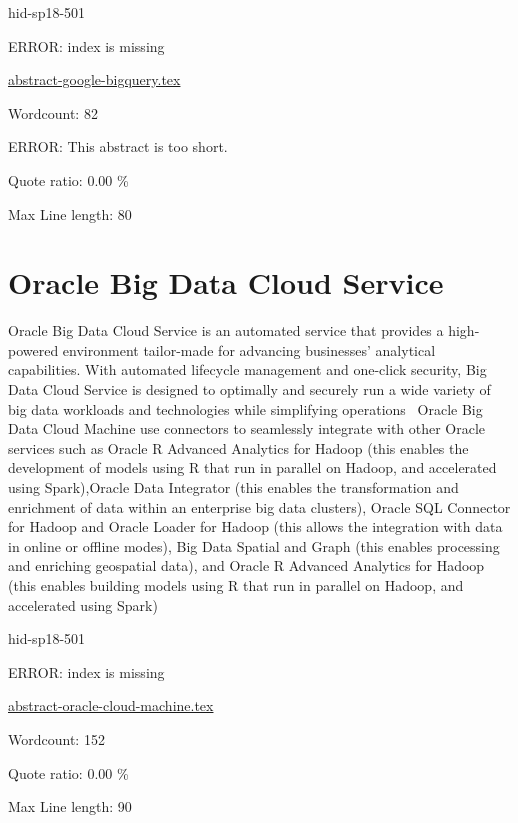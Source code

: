 \begin{IU}

hid-sp18-501

ERROR: index is missing

\href{https://github.com/cloudmesh-community/hid-sp18-501/blob/master//technology/abstract-google-bigquery.tex}{abstract-google-bigquery.tex}

 

Wordcount: 82

ERROR: This abstract is too short.


Quote ratio: 0.00 \%
 
Max Line length: 80
\end{IU}

\section{Oracle Big Data Cloud Service}


Oracle Big Data Cloud Service is an automated service that provides a
high-powered environment tailor-made for advancing businesses' analytical
capabilities. With automated lifecycle management and one-click security, Big
Data Cloud Service is designed to optimally and securely run a wide variety of
big data workloads and technologies while simplifying
operations~\cite{hid-sp18-501-OracleCloud} Oracle Big Data Cloud Machine use connectors to
seamlessly integrate with other Oracle services such as Oracle R Advanced
Analytics for Hadoop (this enables the development of models using R that run in
parallel on Hadoop, and accelerated using Spark),Oracle Data Integrator (this
enables the transformation and enrichment of data within an enterprise big data
clusters), Oracle SQL Connector for Hadoop and Oracle Loader for Hadoop (this
allows the integration with data in online or offline modes), Big Data Spatial
and Graph (this enables processing and enriching geospatial data), and Oracle R
Advanced Analytics for Hadoop (this enables building models using R that run in
parallel on Hadoop, and accelerated using Spark)~\cite{hid-sp18-501-OracleCloud}




\begin{IU}

hid-sp18-501

ERROR: index is missing

\href{https://github.com/cloudmesh-community/hid-sp18-501/blob/master//technology/abstract-oracle-cloud-machine.tex}{abstract-oracle-cloud-machine.tex}

 

Wordcount: 152


Quote ratio: 0.00 \%
 
Max Line length: 90
\end{IU}

